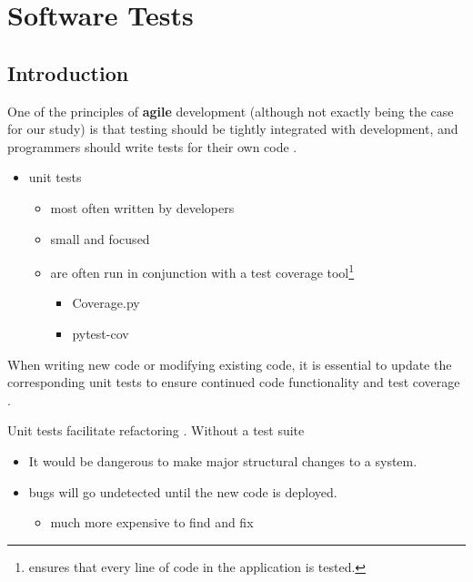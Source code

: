 %
%


\chapter{Software Tests}
\label{chapter:SoftwareTests}


\section{Introduction}

One of the principles of \textbf{agile} development (although not exactly being the case for our study) is that testing should be tightly integrated with development, and programmers should write tests for their own code \cite{Ousterhout:2018}.

\begin{itemize}
	\item unit tests
	\begin{itemize}
		\item most often written by developers
		\item small and focused
		\item are often run in conjunction with a test coverage tool\footnote{ensures that every line of code in the application is tested.}
		\begin{itemize}
			\item Coverage.py
			\item pytest-cov
		\end{itemize}
	\end{itemize}
\end{itemize}

When writing new code or modifying existing code, it is essential to update the corresponding unit tests to ensure continued code functionality and test coverage \cite{Ousterhout:2018}.

Unit tests facilitate refactoring \cite{Ousterhout:2018}. Without a test suite

\begin{itemize}
	\item It would be dangerous to make major structural changes to a system.
	\item bugs will go undetected until the new code is deployed.
	\begin{itemize}
		\item much more expensive to find and fix
	\end{itemize}
\end{itemize}

